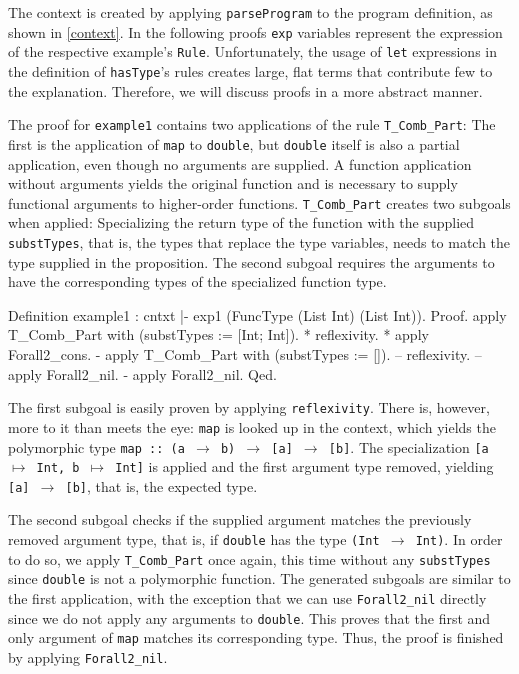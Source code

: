 \documentclass[paper = a4, fleqn, abstract=on, twoside]{scrreprt}
\begin{document}
The context is created by applying \texttt{parseProgram} to the program definition, as shown in \autoref{context}. In the following proofs \texttt{exp} variables represent the expression of the respective example's \texttt{Rule}. Unfortunately, the usage of \texttt{let} expressions in the definition of \texttt{hasType}'s rules creates large, flat terms that contribute few to the explanation. Therefore, we will discuss proofs in a more abstract manner.\\ 
\par
The proof for \texttt{example1} contains two applications of the rule \texttt{T\_Comb\_Part}: The first is the application of \texttt{map} to \texttt{double}, but \texttt{double} itself is also a partial application, even though no arguments are supplied. A function application without arguments yields the original function and is necessary to supply functional arguments to higher-order functions. \texttt{T\_Comb\_Part} creates two subgoals when applied: Specializing the return type of the function with the supplied \texttt{substTypes}, that is, the types that replace the type variables, needs to match the type supplied in the proposition. The second subgoal requires the arguments to have the corresponding types of the specialized function type.
\begin{coqcode}
Definition example1 : cntxt |- exp1 \in (FuncType (List Int) (List Int)).
Proof.
  apply T_Comb_Part with (substTypes := [Int; Int]).
  * reflexivity.
  * apply Forall2_cons.
    - apply T_Comb_Part with (substTypes := []).
      -- reflexivity.
      -- apply Forall2_nil.
    - apply Forall2_nil.
Qed.
\end{coqcode}
The first subgoal is easily proven by applying \texttt{reflexivity}. There is, however, more to it than meets the eye: \texttt{map} is looked up in the context, which yields the polymorphic type \texttt{map :: (a $\rightarrow$ b) $\rightarrow$ [a] $\rightarrow$ [b]}. The specialization \texttt{[a $\mapsto$ Int, b $\mapsto$ Int]} is applied and the first argument type removed, yielding \texttt{[a] $\rightarrow$ [b]}, that is, the expected type.
\par
The second subgoal checks if the supplied argument matches the previously removed argument type, that is, if \texttt{double} has the type \texttt{(Int $\rightarrow$ Int)}. In order to do so, we apply \texttt{T\_Comb\_Part} once again, this time without any \texttt{substTypes} since \texttt{double} is not a polymorphic function. The generated subgoals are similar to the first application, with the exception that we can use \texttt{Forall2\_nil} directly since we do not apply any arguments to \texttt{double}. This proves that the first and only argument of \texttt{map} matches its corresponding type. Thus, the proof is finished by applying \texttt{Forall2\_nil}.
\end{document}
